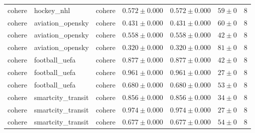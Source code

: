 \begin{table}[htbp]
\begin{tabular}{l l l r r r r}
cohere & hockey\_nhl & cohere & $0.572\pm0.000$ & $0.572\pm0.000$ & $59\pm0$ & 8 \\
cohere & aviation\_opensky & cohere & $0.431\pm0.000$ & $0.431\pm0.000$ & $60\pm0$ & 8 \\
cohere & aviation\_opensky & cohere & $0.558\pm0.000$ & $0.558\pm0.000$ & $42\pm0$ & 8 \\
cohere & aviation\_opensky & cohere & $0.320\pm0.000$ & $0.320\pm0.000$ & $81\pm0$ & 8 \\
cohere & football\_uefa & cohere & $0.877\pm0.000$ & $0.877\pm0.000$ & $42\pm0$ & 8 \\
cohere & football\_uefa & cohere & $0.961\pm0.000$ & $0.961\pm0.000$ & $27\pm0$ & 8 \\
cohere & football\_uefa & cohere & $0.680\pm0.000$ & $0.680\pm0.000$ & $53\pm0$ & 8 \\
cohere & smartcity\_transit & cohere & $0.856\pm0.000$ & $0.856\pm0.000$ & $34\pm0$ & 8 \\
cohere & smartcity\_transit & cohere & $0.974\pm0.000$ & $0.974\pm0.000$ & $27\pm0$ & 8 \\
cohere & smartcity\_transit & cohere & $0.677\pm0.000$ & $0.677\pm0.000$ & $54\pm0$ & 8 \\
\hline
\end{tabular}
\end{table}
